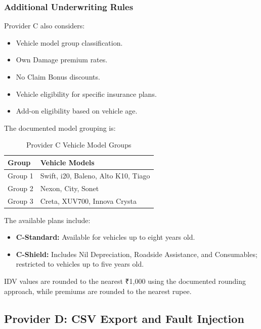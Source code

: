 \documentclass[11pt,a4paper]{article}
\begin{document}
\subsubsection{Additional Underwriting Rules}

Provider C also considers:

\begin{itemize}
    \item Vehicle model group classification.
    \item Own Damage premium rates.
    \item No Claim Bonus discounts.
    \item Vehicle eligibility for specific insurance plans.
    \item Add-on eligibility based on vehicle age.
\end{itemize}

The documented model grouping is:

\begin{table}[H]
\centering
\caption{Provider C Vehicle Model Groups}
\begin{tabularx}{\textwidth}{L{2.2cm}Y}
\toprule
\textbf{Group} & \textbf{Vehicle Models} \\
\midrule
Group 1 & Swift, i20, Baleno, Alto K10, Tiago \\
Group 2 & Nexon, City, Sonet \\
Group 3 & Creta, XUV700, Innova Crysta \\
\bottomrule
\end{tabularx}
\end{table}

The available plans include:

\begin{itemize}
    \item \textbf{C-Standard:} Available for vehicles up to
    eight years old.
    \item \textbf{C-Shield:} Includes Nil Depreciation,
    Roadside Assistance, and Consumables; restricted to
    vehicles up to five years old.
\end{itemize}

IDV values are rounded to the nearest ₹1,000 using the documented
rounding approach, while premiums are rounded to the nearest rupee.


\subsection{Provider D: CSV Export and Fault Injection}
\end{document}
